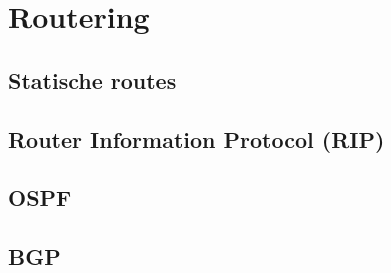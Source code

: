 \chapter{Routering}
\label{sec:routering}

\section{Statische routes}



\section{Router Information Protocol (RIP)}

\section{OSPF}

\section{BGP}

